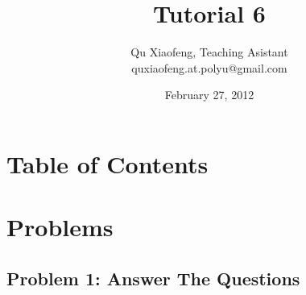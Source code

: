 \documentclass[
        ]{beamer}
\title{Tutorial 6}
\author[COMP435p]{Qu Xiaofeng\texorpdfstring{, Teaching Asistant\\\tiny{quxiaofeng.at.polyu@gmail.com}}{}}
\institute{COMP435p\\Biometrics Authentication}
\date{February 27, 2012}
\begin{document}
\newcommand{\inpdfu}[2]{\begin{figure}\centering\texttt{[image: im/lecture\_\#1]}\end{figure}}
\newcommand{\inpdfl}[2]{\begin{figure}\centering\texttt{[image: im/lecture\_\#1]}\end{figure}}
\newcommand{\inpdfc}[2]{\begin{figure}\centering\texttt{[image: im/lecture\_\#1]}\end{figure}}
\newcommand{\inpng}[1]{\begin{figure}\centering\texttt{[image: im/\#1]}\end{figure}}

\frame{\titlepage}

\section*{Table of Contents}

    \begin{frame}{\secname}
        \tableofcontents
    \end{frame}




\section{Problems}

    \subsection{Problem 1: Answer The Questions}
    
\end{document}
